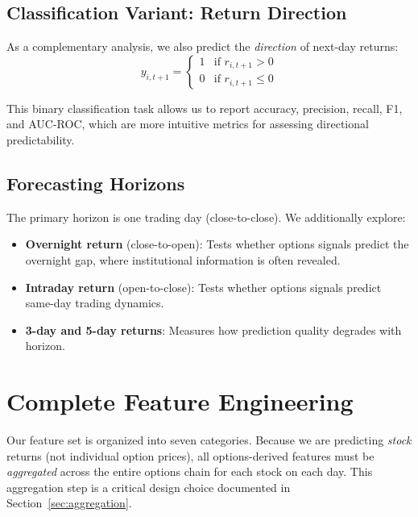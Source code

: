\documentclass[11pt,a4paper]{article}
\begin{document}
\subsection{Classification Variant: Return Direction}

As a complementary analysis, we also predict the \emph{direction} of next-day returns:
\begin{equation}
y_{i,t+1} = 
\begin{cases}
1 & \text{if } r_{i,t+1} > 0 \\
0 & \text{if } r_{i,t+1} \leq 0
\end{cases}
\end{equation}

This binary classification task allows us to report accuracy, precision, recall, F1, and AUC-ROC, which are more intuitive metrics for assessing directional predictability.

\subsection{Forecasting Horizons}

The primary horizon is one trading day (close-to-close). We additionally explore:
\begin{itemize}[nosep]
    \item \textbf{Overnight return} (close-to-open): Tests whether options signals predict the overnight gap, where institutional information is often revealed.
    \item \textbf{Intraday return} (open-to-close): Tests whether options signals predict same-day trading dynamics.
    \item \textbf{3-day and 5-day returns}: Measures how prediction quality degrades with horizon.
\end{itemize}


\section{Complete Feature Engineering}

Our feature set is organized into seven categories. Because we are predicting \emph{stock} returns (not individual option prices), all options-derived features must be \emph{aggregated} across the entire options chain for each stock on each day. This aggregation step is a critical design choice documented in Section~\ref{sec:aggregation}.
\end{document}
